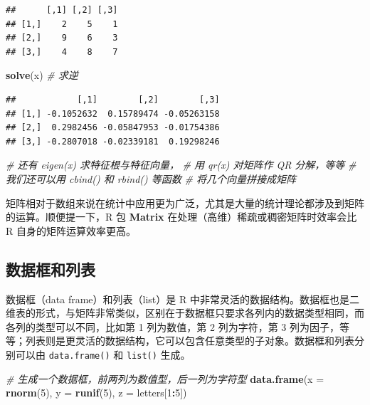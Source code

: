 \documentclass[
  b5paper,
  UTF8,twoside]{book}
\newenvironment{Shaded}{\begin{snugshade}}{\end{snugshade}}
\newcommand{\AttributeTok}[1]{\textcolor[rgb]{0.13,0.29,0.53}{#1}}
\newcommand{\CommentTok}[1]{\textcolor[rgb]{0.56,0.35,0.01}{\textit{#1}}}
\newcommand{\DecValTok}[1]{\textcolor[rgb]{0.00,0.00,0.81}{#1}}
\newcommand{\FunctionTok}[1]{\textcolor[rgb]{0.13,0.29,0.53}{\textbf{#1}}}
\newcommand{\NormalTok}[1]{#1}
\newcommand{\SpecialCharTok}[1]{\textcolor[rgb]{0.81,0.36,0.00}{\textbf{#1}}}
\begin{document}
\begin{verbatim}
##      [,1] [,2] [,3]
## [1,]    2    5    1
## [2,]    9    6    3
## [3,]    4    8    7
\end{verbatim}

\begin{Shaded}
\begin{Highlighting}[]
\FunctionTok{solve}\NormalTok{(x) }\CommentTok{\# 求逆}
\end{Highlighting}
\end{Shaded}

\begin{verbatim}
##            [,1]        [,2]        [,3]
## [1,] -0.1052632  0.15789474 -0.05263158
## [2,]  0.2982456 -0.05847953 -0.01754386
## [3,] -0.2807018 -0.02339181  0.19298246
\end{verbatim}

\begin{Shaded}
\begin{Highlighting}[]
\CommentTok{\# 还有 eigen(x) 求特征根与特征向量，}
\CommentTok{\#   用 qr(x) 对矩阵作 QR 分解，等等}
\CommentTok{\# 我们还可以用 cbind() 和 rbind() 等函数}
\CommentTok{\#   将几个向量拼接成矩阵}
\end{Highlighting}
\end{Shaded}

矩阵相对于数组来说在统计中应用更为广泛，尤其是大量的统计理论都涉及到矩阵的运算。顺便提一下，R 包 \textbf{Matrix} \citep{Matrix} 在处理（高维）稀疏或稠密矩阵时效率会比 R 自身的矩阵运算效率更高。

\subsection{数据框和列表}\label{ux6570ux636eux6846ux548cux5217ux8868}

数据框（data frame）和列表（list）是 R 中非常灵活的数据结构。数据框也是二维表的形式，与矩阵非常类似，区别在于数据框只要求各列内的数据类型相同，而各列的类型可以不同，比如第 1 列为数值，第 2 列为字符，第 3 列为因子，等等；列表则是更灵活的数据结构，它可以包含任意类型的子对象。数据框和列表分别可以由 \texttt{data.frame()} 和 \texttt{list()} 生成。

\begin{Shaded}
\begin{Highlighting}[]
\CommentTok{\# 生成一个数据框，前两列为数值型，后一列为字符型}
\FunctionTok{data.frame}\NormalTok{(}\AttributeTok{x =} \FunctionTok{rnorm}\NormalTok{(}\DecValTok{5}\NormalTok{), }\AttributeTok{y =} \FunctionTok{runif}\NormalTok{(}\DecValTok{5}\NormalTok{), }\AttributeTok{z =}\NormalTok{ letters[}\DecValTok{1}\SpecialCharTok{:}\DecValTok{5}\NormalTok{])}
\end{Highlighting}
\end{Shaded}
\end{document}
